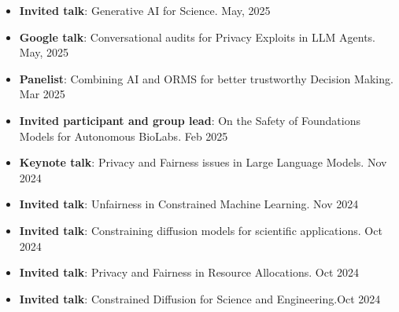 
\vspace{6pt}
\begin{itemize}
  \item {\bf Invited talk}: Generative AI for Science. \hfill{May, 2025}\\
  {}

  \item {\bf Google talk}: Conversational audits for Privacy Exploits in LLM Agents. \hfill{May, 2025}\\
  {}

  \item {\bf Panelist}: Combining AI and ORMS for better trustworthy Decision Making.
  \hfill {Mar 2025}\\

  \item {\bf Invited participant and group lead}: 
  On the Safety of Foundations Models for Autonomous BioLabs.
  \hfill {Feb 2025}\\

  \item {\bf Keynote talk}: Privacy and Fairness issues in Large Language Models.
  \hfill {Nov 2024}\\

  \item {\bf Invited talk}: Unfairness in Constrained Machine Learning.
  \hfill {Nov 2024}\\

  \item {\bf Invited talk}: Constraining diffusion models for scientific applications.
  \hfill {Oct 2024}\\

  \item {\bf Invited talk}: Privacy and Fairness in Resource Allocations. \hfill{Oct 2024}\\

  \item {\bf Invited talk}: Constrained Diffusion for Science and Engineering.\hfill {Oct 2024}\\


\end{itemize}
